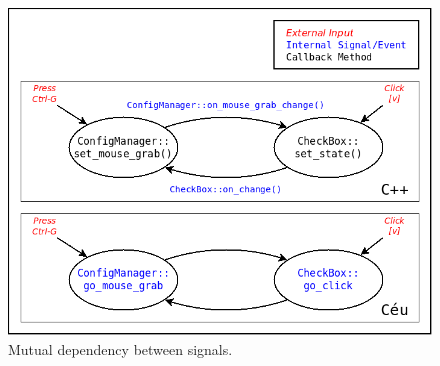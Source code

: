 \documentclass{vgtc}                          %
\begin{document}
\begin{figure}[t]
\centering
\includegraphics[width=\columnwidth]{events}
\caption{Mutual dependency between signals.
\label{fig.events}
}
\end{figure}
\end{document}

